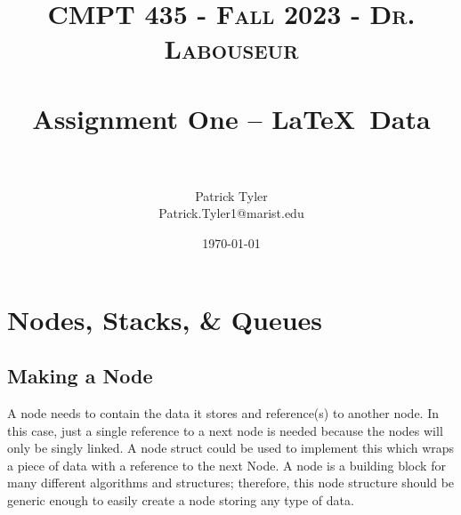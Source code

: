 \documentclass[letterpaper, 10pt]{article}
\title{	
   \normalfont \normalsize 
   \textsc{CMPT 435 - Fall 2023 - Dr. Labouseur} \\[10pt] %
   \horrule{0.5pt} \\[0.25cm] 	%
   \huge Assignment One -- \LaTeX ~Data\\     	    %
   \horrule{0.5pt} \\[0.25cm] 	%
}
\author{Patrick Tyler \\ \normalsize Patrick.Tyler1@marist.edu}
\date{\normalsize\today} 	%
\begin{document}
\maketitle %


\section{Nodes, Stacks, \& Queues}
\subsection{Making a Node}
A node needs to contain the data it stores and reference(s) to another node.
In this case, just a single reference to a next node is needed because the nodes will only be singly linked.
A node struct could be used to implement this which wraps a piece of data with a reference to the next Node.
A node is a building block for many different algorithms and structures; 
therefore, this node structure should be generic enough to easily create a node storing any type of data.

\end{document}
